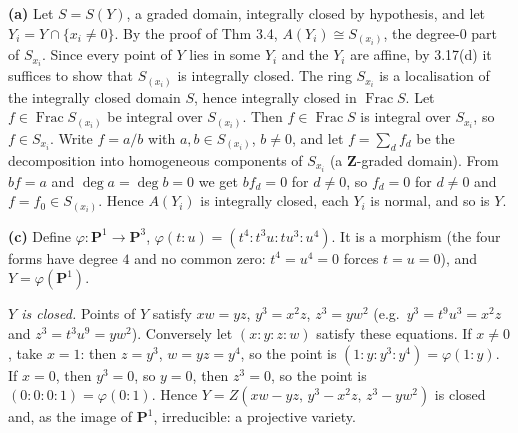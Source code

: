 \documentclass[11pt]{article}
\begin{document}
\pf
\textbf{(a)} Let $S=S(Y)$, a graded domain, integrally closed by hypothesis, and let $Y_i=Y\cap\{x_i\neq0\}$. By the proof of Thm 3.4, $A(Y_i)\cong S_{(x_i)}$, the degree-$0$ part of $S_{x_i}$. Since every point of $Y$ lies in some $Y_i$ and the $Y_i$ are affine, by 3.17(d) it suffices to show that $S_{(x_i)}$ is integrally closed. The ring $S_{x_i}$ is a localisation of the integrally closed domain $S$, hence integrally closed in $\operatorname{Frac}S$. Let $f\in\operatorname{Frac}S_{(x_i)}$ be integral over $S_{(x_i)}$. Then $f\in\operatorname{Frac}S$ is integral over $S_{x_i}$, so $f\in S_{x_i}$. Write $f=a/b$ with $a,b\in S_{(x_i)}$, $b\neq0$, and let $f=\sum_df_d$ be the decomposition into homogeneous components of $S_{x_i}$ (a $\mathbf Z$-graded domain). From $bf=a$ and $\deg a=\deg b=0$ we get $bf_d=0$ for $d\neq0$, so $f_d=0$ for $d\ne0$ and $f=f_0\in S_{(x_i)}$. Hence $A(Y_i)$ is integrally closed, each $Y_i$ is normal, and so is $Y$.

\textbf{(c)} Define $\varphi\colon\mathbf P^1\to\mathbf P^3$, $\varphi(t:u)=(t^4:t^3u:tu^3:u^4)$. It is a morphism (the four forms have degree $4$ and no common zero: $t^4=u^4=0$ forces $t=u=0$), and $Y=\varphi(\mathbf P^1)$.

\emph{$Y$ is closed.} Points of $Y$ satisfy $xw=yz$, $y^3=x^2z$, $z^3=yw^2$ (e.g.\ $y^3=t^9u^3=x^2z$ and $z^3=t^3u^9=yw^2$). Conversely let $(x:y:z:w)$ satisfy these equations. If $x\neq0$, take $x=1$: then $z=y^3$, $w=yz=y^4$, so the point is $(1:y:y^3:y^4)=\varphi(1:y)$. If $x=0$, then $y^3=0$, so $y=0$, then $z^3=0$, so the point is $(0:0:0:1)=\varphi(0:1)$. Hence $Y=Z(xw-yz,\,y^3-x^2z,\,z^3-yw^2)$ is closed and, as the image of $\mathbf P^1$, irreducible: a projective variety.
\end{document}
